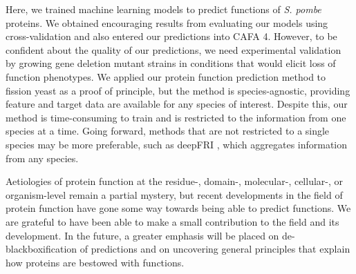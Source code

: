 Here, we trained machine learning models to predict functions of \emph{S. pombe} proteins. We obtained encouraging results from evaluating our models using cross-validation and also entered our predictions into CAFA 4. However, to be confident about the quality of our predictions, we need experimental validation by growing gene deletion mutant strains in conditions that would elicit loss of function phenotypes. We applied our protein function prediction method to fission yeast as a proof of principle, but the method is species-agnostic, providing feature and target data are available for any species of interest. Despite this, our method is time-consuming to train and is restricted to the information from one species at a time. Going forward, methods that are not restricted to a single species may be more preferable, such as deepFRI \cite{Gligorijevic2019}, which aggregates information from any species.

Aetiologies of protein function at the residue-, domain-, molecular-, cellular-, or organism-level remain a partial mystery, but recent developments in the field of protein function have gone some way towards being able to predict functions. We are grateful to have been able to make a small contribution to the field and its development. In the future, a greater emphasis will be placed on de-blackboxification of predictions and on uncovering general principles that explain how proteins are bestowed with functions.
